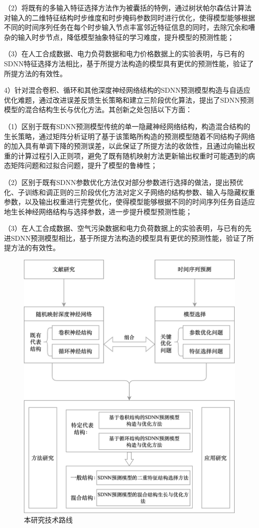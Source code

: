 （2）将既有的多输入特征选择方法作为被囊括的特例，通过树状帕尔森估计算法对输入的二维特征结构时步维度和时步掩码参数同时进行优化，使得模型能够根据不同的时间序列任务在每个时步输入节点丰富邻近特征信息的同时，去除冗余和嘈杂的输入时步节点，降低模型抽象特征的学习难度，提升模型的预测性能；

（3）在人工合成数据、电力负荷数据和电力价格数据上的实验表明，与已有的SDNN特征选择方法相比，基于所提方法构造的模型具有更优的预测性能，验证了所提方法的有效性。

4）针对混合卷积、循环和其他深度神经网络结构的SDNN预测模型构造与自适应优化难题，通过改进误差反馈生长策略和建立三阶段优化算法，提出了SDNN预测模型的混合结构生长与优化方法。其创新之处包括以下方面：

（1）区别于既有SDNN预测模型传统的单一隐藏神经网络结构，构造混合结构的生长策略，通过矩阵分析证明了基于该策略所构造的预测模型随着不同结构子网络的加入具有单调下降的预测误差，以此保证了所提方法的收敛性，且通过向输出权重的计算过程引入正则项，避免了既有随机映射方法更新输出权重时可能遇到的病态矩阵问题和过拟合问题，提升了模型的鲁棒性；

（2）区别于既有SDNN参数优化方法仅对部分参数进行选择的做法，提出预优化、子训练和调正则的三阶段优化方法对定义子网络的结构参数、输入与隐藏权重参数，以及输出权重进行完整优化，使得模型能够根据不同的时间序列任务自适应地生长神经网络结构与选择参数，进一步提升模型预测性能；

（3）在人工合成数据、空气污染数据和电力负荷数据上的实验表明，与已有的先进SDNN预测模型相比，基于所提方法构造的模型具有更优的预测性能，验证了所提方法的有效性。

\begin{figure}[!t]
    \centering
    \includegraphics[width=0.8\linewidth]{float/ch.intro/thesis_arch.png}
    \caption{\label{fig:body}本研究技术路线}
\end{figure}
